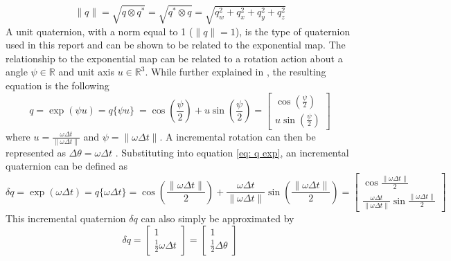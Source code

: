 \begin{equation}
    \|q\| = \sqrt{q \otimes q^*} = \sqrt{q^* \otimes q} = \sqrt{q_w^2 + q_x^2 + q_y^2 + q_z^2}
    \label{eq: quaterion conjugate property}
\end{equation}
A unit quaternion, with a norm equal to 1 ($\|q\| = 1$), is the type of quaternion used in this report and can be shown to be related to the exponential map. The relationship to the exponential map can be related to a rotation action about a angle $\psi \in \mathbb{R}$ and unit axis $u \in \mathbb{R}^3$. While further explained in \cite{Quaternion_Kinematics_for_the_Error-state_EKF}, the resulting equation is the following
\begin{equation}
    q = \exp{(\psi u)} = q\{ \psi u \}\ = \cos{(\frac{\psi}{2})} + u \sin{(\frac{\psi}{2})} = \begin{bmatrix}
                \cos{(\frac{\psi}{2})} \\
                u \sin{(\frac{\psi}{2})}
            \end{bmatrix} 
    \label{eq: q exp}
\end{equation}
where $u = \frac{\omega \Delta t}{\| \omega \Delta t\|}$ and $\psi = \| \omega \Delta t\|$. A incremental rotation can then be represented as $\Delta \theta = \omega \Delta t$ . Substituting into equation \eqref{eq: q exp}, an incremental quaternion can be defined as
\begin{equation}
    \delta q = \exp{(\omega \Delta t)} = q\{\omega \Delta t\} = \cos{(\frac{\| \omega \Delta t\|}{2})} +             \frac{\omega \Delta t}{\| \omega \Delta t\|} \sin{(\frac{\| \omega \Delta t\|}{2})} 
    = \begin{bmatrix}
                \cos{\frac{\| \omega \Delta t\|}{2}} \\
                \frac{\omega \Delta t}{\| \omega \Delta t\|} \sin{\frac{\| \omega \Delta t\|}{2}}
            \end{bmatrix} 
    \label{eq: q exp with omega delta t}
\end{equation}
This incremental quaternion $\delta q$ can also simply be approximated by \cite{Quaternion_Kinematics_for_the_Error-state_EKF}
\begin{equation}
    \delta q = \begin{bmatrix}
        1 \\
        \frac{1}{2} \omega \Delta t
    \end{bmatrix} = \begin{bmatrix}
        1 \\
        \frac{1}{2} \Delta \theta
    \end{bmatrix}
    \label{eq: delta q approx}
\end{equation}

